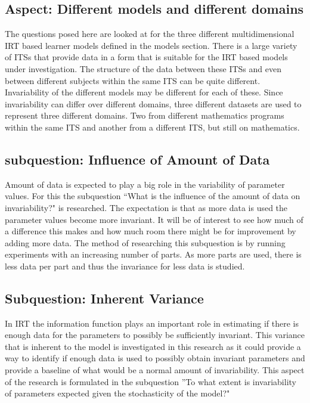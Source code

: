\documentclass{scrartcl}
\begin{document}
\subsection{Aspect: Different models and different domains}
The questions posed here are looked at for the three different multidimensional IRT based learner models defined in the models section. There is a large variety of ITSs that provide data in a form that is suitable for the IRT based models under investigation. The structure of the data between these ITSs and even between different subjects within the same ITS can be quite different. Invariability of the different models may be different for each of these. Since invariability can differ over different domains, three different datasets are used to represent three different domains. Two from different mathematics programs within the same ITS and another from a different ITS, but still on mathematics.

\subsection{subquestion: Influence of Amount of Data}
Amount of data is expected to play a big role in the variability of parameter values. For this the subquestion ``What is the influence of the amount of data on invariability?" is researched. The expectation is that as more data is used the parameter values become more invariant. It will be of interest to see how much of a difference this makes and how much room there might be for improvement by adding more data. The method of researching this subquestion is by running experiments with an increasing number of parts. As more parts are used, there is less data per part and thus the invariance for less data is studied.

\subsection{Subquestion: Inherent Variance}
In IRT the information function plays an important role in estimating if there is enough data for the parameters to possibly be sufficiently invariant. This variance that is inherent to the model is investigated in this research as it could provide a way to identify if enough data is used to possibly obtain invariant parameters and provide a baseline of what would be a normal amount of invariability. This aspect of the research is formulated in the subquestion ''To what extent is invariability of parameters expected given the stochasticity of the model?"
\end{document}
